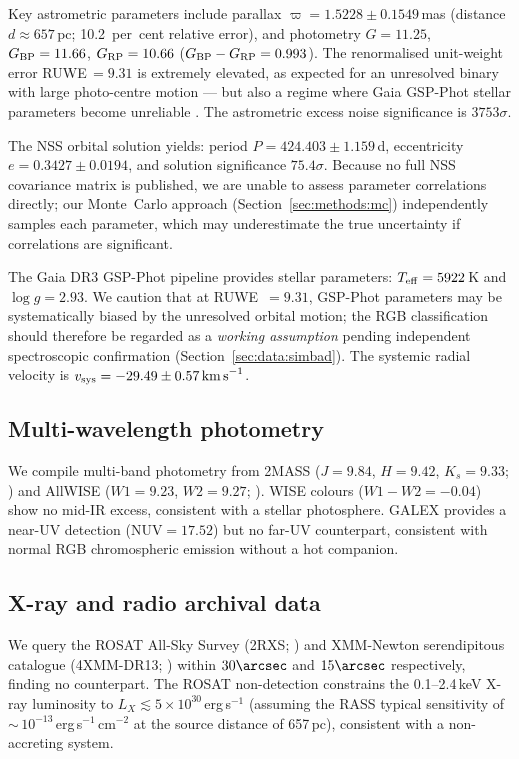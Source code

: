 \documentclass[usenatbib,fleqn]{mnras}
\newcommand{\kms}{{\rm km\,s}^{-1}}
\begin{document}
Key astrometric parameters include parallax
$\varpi = 1.5228 \pm 0.1549$\,mas (distance $d \approx 657$\,pc;
10.2~per~cent relative error),
and photometry $G = 11.25$, $G_{\rm BP} = 11.66$,
$G_{\rm RP} = 10.66$ ($G_{\rm BP} - G_{\rm RP} = 0.993$).
The renormalised unit-weight error RUWE$\,= 9.31$ is extremely
elevated, as expected for an unresolved binary with large
photo-centre motion --- but also a regime where
Gaia GSP-Phot stellar parameters become unreliable
\citep{Andrae2023}.  The astrometric excess noise significance is
$3753\sigma$.

The NSS orbital solution yields:
period $P = 424.403 \pm 1.159$\,d,
eccentricity $e = 0.3427 \pm 0.0194$,
and solution significance $75.4\sigma$.
Because no full NSS covariance matrix is published, we are unable to
assess parameter correlations directly; our Monte~Carlo approach
(Section~\ref{sec:methods:mc}) independently samples each parameter,
which may underestimate the true uncertainty if correlations are
significant.

The Gaia DR3 GSP-Phot pipeline provides stellar parameters:
$T_{\rm eff} = 5922$\,K and $\log g = 2.93$.  We caution that at
RUWE~$= 9.31$, GSP-Phot parameters may be systematically biased
by the unresolved orbital motion; the RGB classification should
therefore be regarded as a \emph{working assumption} pending
independent spectroscopic confirmation
(Section~\ref{sec:data:simbad}).
The systemic radial velocity is
$v_{\rm sys} = -29.49 \pm 0.57\,\kms$.

\subsection{Multi-wavelength photometry}
\label{sec:data:phot}

We compile multi-band photometry from 2MASS
($J = 9.84$, $H = 9.42$, $K_s = 9.33$; \citealt{Cutri2003}) and
AllWISE ($W1 = 9.23$, $W2 = 9.27$; \citealt{Cutri2014}).
WISE colours ($W1 - W2 = -0.04$) show no mid-IR excess,
consistent with a stellar photosphere.
GALEX \citep{Bianchi2017} provides a near-UV detection
($\mathrm{NUV} = 17.52$) but no far-UV counterpart, consistent
with normal RGB chromospheric emission without a hot companion.

\subsection{X-ray and radio archival data}
\label{sec:data:xray}

We query the ROSAT All-Sky Survey (2RXS; \citealt{Boller2016}) and
XMM-Newton serendipitous catalogue (4XMM-DR13;
\citealt{Webb2020}) within $30\arcsec$ and $15\arcsec$
respectively, finding no counterpart.  The ROSAT non-detection
constrains the 0.1--2.4\,keV X-ray luminosity to
$L_X \lesssim 5 \times 10^{30}$\,erg\,s$^{-1}$ (assuming
the RASS typical sensitivity of
$\sim$\,$10^{-13}$\,erg\,s$^{-1}$\,cm$^{-2}$ at the
source distance of 657\,pc), consistent with a non-accreting
system.
\end{document}
